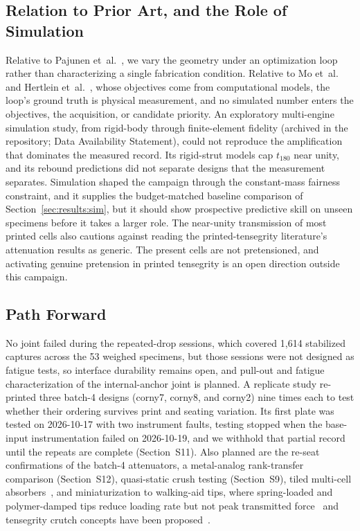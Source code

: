 \documentclass[11pt]{article}
\begin{document}
\subsection{Relation to Prior Art, and the Role of Simulation}
Relative
to Pajunen et~al.~\cite{pajunen2019design}, we vary the geometry under an
optimization loop rather than characterizing a single fabrication
condition. Relative to Mo et~al.~\cite{mo2023accelerated} and Hertlein
et~al.~\cite{hertlein2024latticeimpact}, whose objectives come from
computational models, the loop's ground truth is physical measurement,
and no simulated number enters the objectives, the acquisition, or
candidate priority. An exploratory
multi-engine simulation study, from rigid-body through finite-element
fidelity (archived in the repository; Data Availability Statement),
could not reproduce the amplification that dominates the measured
record. Its rigid-strut models cap $t_{180}$ near unity, and its rebound
predictions did not separate designs that the measurement separates.
Simulation shaped the campaign through the constant-mass fairness
constraint, and it supplies the budget-matched baseline comparison of
Section~\ref{sec:results:sim}, but it should show prospective predictive
skill on unseen specimens before it takes a larger role. The near-unity
transmission of most printed cells also cautions against reading the
printed-tensegrity literature's attenuation results as generic. The
present cells are not pretensioned, and activating genuine pretension in
printed tensegrity is an open direction outside this campaign.

\subsection{Path Forward}
No joint failed during the repeated-drop
sessions, which covered 1,614 stabilized captures across the 53 weighed
specimens, but those sessions were
not designed as fatigue tests, so interface durability remains open, and
pull-out and fatigue characterization of the internal-anchor joint is
planned. A replicate study re-printed three batch-4 designs (corny7,
corny8, and corny2) nine times each to test whether their ordering
survives print and seating variation. Its first plate was tested on
2026-10-17 with two instrument faults, testing stopped when the
base-input instrumentation failed on 2026-10-19, and we withhold that
partial record until the repeats are complete
(Section~S11). Also planned are the re-seat confirmations of the batch-4
attenuators, a metal-analog rank-transfer comparison
(Section~S12), quasi-static crush testing
(Section~S9), tiled multi-cell
absorbers~\citep{sabounizawadzka2024experimental}, and miniaturization
to walking-aid tips, where spring-loaded and polymer-damped tips reduce
loading rate but not peak transmitted
force~\citep{segura2007mechanicsofambulation,
macgillivray2016theinfluenceof} and tensegrity crutch concepts have been
proposed~\citep{gu2026tensegritycrutches}.
\end{document}
